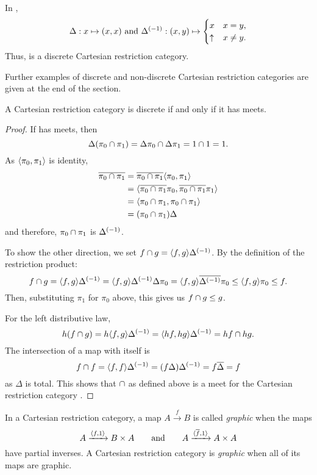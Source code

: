 \begin{example}\label{ex:par_is_discrete}
  In \Par,
  \[
    \Delta: x \mapsto (x,x)\text{ and }{\Delta}^{(-1)}:(x,y)\mapsto\begin{cases}
      x& x = y,\\
      \uparrow & x\ne y.
    \end{cases}
  \]
  Thus, \Par is a discrete Cartesian restriction category.
\end{example}

Further examples of discrete and non-discrete Cartesian restriction categories are given at the end
of the section.

\begin{theorem}\label{thm:a_crc_is_discrete_iff_it_has_meets}
  A Cartesian restriction category \X is discrete if and only if it has meets.
\end{theorem}
\begin{proof}
  If \X has meets, then
  \[
    \Delta(\pi_0 \cap \pi_1) = \Delta\pi_0 \cap \Delta\pi_1 = 1\cap 1 = 1.
  \]
  As $\langle\pi_0,\pi_1\rangle$ is identity,
  \begin{align*}
    \overline{\pi_0 \cap \pi_1} &= \overline{\pi_0 \cap \pi_1} \langle\pi_0, \pi_1\rangle \\
    &=\langle\overline{\pi_0 \cap \pi_1}\pi_0, \overline{\pi_0 \cap \pi_1}\pi_1\rangle\\
    &=\langle\pi_0 \cap \pi_1,\pi_0 \cap \pi_1\rangle\\
    &=(\pi_0 \cap \pi_1 )\Delta
  \end{align*}
  and therefore, $\pi_0 \cap \pi_1$ is ${\Delta}^{(-1)}$.

  To show the other direction, we set $f\cap g = \langle f,g\rangle{\Delta}^{(-1)}$.
  By the definition of the restriction product:
  \[
    f \cap g =  \langle f,g\rangle{\Delta}^{(-1)} =\langle f,g\rangle{\Delta}^{(-1)} \Delta \pi_0 =
      \langle f,g\rangle\overline{{\Delta}^{(-1)}}\pi_0 \le \langle f,g\rangle\pi_0 \le f.
  \]
  Then, substituting $\pi_1$ for $\pi_0$ above, this gives us $f \cap g \le g$.

  For the left distributive law,
  \[
    h(f \cap g) = h \langle f,g\rangle{\Delta}^{(-1)} =  \langle h f,h g\rangle{\Delta}^{(-1)} = h f \cap h g.
  \]
  The intersection of a map with itself is
  \[
    f\cap f = \langle f,f\rangle {\Delta}^{(-1)} = (f \Delta) {\Delta}^{(-1)} = f \overline{\Delta} = f
  \]
  as $\Delta$ is total. This shows that $\cap$ as defined above is a meet for the
  Cartesian restriction category \X.

\end{proof}

\begin{definition}\label{def:graphic_map}
  In a Cartesian restriction category, a map $A\xrightarrow{f}B$ is called \emph{graphic} when the
  maps
  \[
    A\xrightarrow{\langle f,1\rangle}B\times A\qquad \text{and}\qquad
    A\xrightarrow{\langle\overline{f},1\rangle}A\times A
  \]
  have partial inverses. A Cartesian restriction category is \emph{graphic} when all of its maps
  are graphic.
\end{definition}

